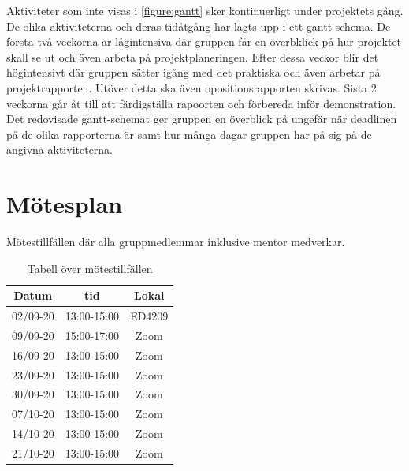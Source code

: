 \documentclass[a4paper]{article}
\begin{document}
Aktiviteter som inte visas i \ref{figure:gantt} sker kontinuerligt under projektets gång. De olika aktiviteterna och deras tidåtgång har lagts upp i ett gantt-schema. De första två veckorna är lågintensiva där gruppen får en överbklick på hur projektet skall se ut och även arbeta på projektplaneringen. Efter dessa veckor blir det högintensivt där gruppen sätter igång med det praktiska och även arbetar på projektrapporten. Utöver detta ska även opositionsrapporten skrivas. Sista 2 veckorna går åt till att färdigställa rapoorten och förbereda inför demonstration. Det redovisade gantt-schemat ger gruppen en överblick på ungefär när deadlinen på de olika rapporterna är samt hur många dagar gruppen har på sig på de angivna aktiviteterna. 

\section{Mötesplan}

Mötestillfällen där alla gruppmedlemmar inklusive mentor medverkar.

\begin{table}[H]
    \begin{center}
        \begin{tabular}{ |c|c|c| }\hline
            Datum & tid & Lokal \\\hline\hline
            02/09-20 & 13:00-15:00 & ED4209 \\\hline
            09/09-20 & 15:00-17:00 & Zoom \\\hline
            16/09-20 & 13:00-15:00 & Zoom \\\hline
            23/09-20 & 13:00-15:00 & Zoom \\\hline
            30/09-20 & 13:00-15:00 & Zoom \\\hline
            07/10-20 & 13:00-15:00 & Zoom \\\hline
            14/10-20 & 13:00-15:00 & Zoom \\\hline
            21/10-20 & 13:00-15:00 & Zoom \\\hline
        \end{tabular}
        \caption{Tabell över mötestillfällen}
        \label{table:motesplan}
    \end{center}
\end{table}
\end{document}
